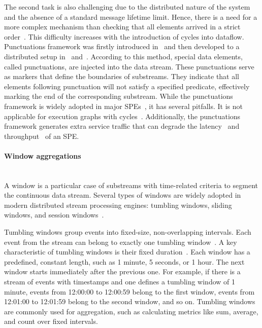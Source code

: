 The second task is also challenging due to the distributed nature of the system and the absence of a standard message lifetime limit. Hence, there is a need for a more complex mechanism than checking that all elements arrived in a strict order~\cite{Li:2008:OPN:1453856.1453890}. This difficulty increases with the introduction of cycles into dataflow. Punctuations framework was firstly introduced in~\cite{Tucker:2003:EPS:776752.776780} and then developed to a distributed setup in~\cite{Akidau:2015:DMP:2824032.2824076} and~\cite{Carbone:2017:SMA:3137765.3137777}. According to this method, special data elements, called punctuations, are injected into the data stream. These punctuations serve as markers that define the boundaries of substreams. They indicate that all elements following punctuation will not satisfy a specified predicate, effectively marking the end of the corresponding substream. While the punctuations framework is widely adopted in major SPEs~\cite{carbone2015apache, Noghabi:2017:SSS:3137765.3137770, Kulkarni:2015:THS:2723372.2742788}, it has several pitfalls. It is not applicable for execution graphs with cycles~\cite{carbone2018scalable}. Additionally, the punctuations framework generates extra service traffic that can degrade the latency~\cite{DBLP:journals/pvldb/BegoliACHKKMS21} and throughput~\cite{Li:2008:OPN:1453856.1453890} of an SPE.

\paragraph{Window aggregations} \mbox{} \\

A window is a particular case of substreams with time-related criteria to segment the continuous data stream. Several types of windows are widely adopted in modern distributed stream processing engines: tumbling windows, sliding windows, and session windows~\cite{verwiebe2023survey}.

Tumbling windows group events into fixed-size, non-overlapping intervals. Each event from the stream can belong to exactly one tumbling window~\cite{carbone2019stream}. A key characteristic of tumbling windows is their fixed duration~\cite{patroumpas2006window}. Each window has a predefined, constant length, such as 1 minute, 5 seconds, or 1 hour. The next window starts immediately after the previous one. For example, if there is a stream of events with timestamps and one defines a tumbling window of 1 minute, events from 12:00:00 to 12:00:59 belong to the first window, events from 12:01:00 to 12:01:59 belong to the second window, and so on. Tumbling windows are commonly used for aggregation, such as calculating metrics like sum, average, and count over fixed intervals.

